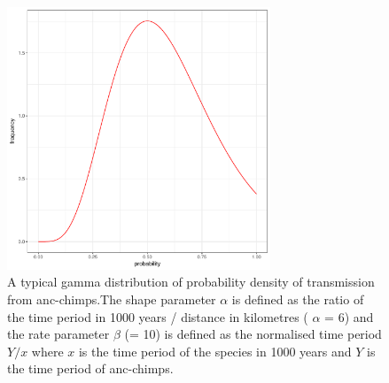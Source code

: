 \documentclass[fleqn,10pt]{wlscirep}
\begin{document}
\begin{figure}[!h]
	\centering
	\includegraphics[width=0.7\textwidth]{figs/gamma-chimp}
	\caption{ A typical gamma distribution of probability density of transmission from anc-chimps.The shape parameter $\alpha$ is defined as the ratio of the time period in 1000 years / distance in kilometres ( $\alpha$ = 6) and the rate parameter $\beta$ (= 10) is defined as the normalised time period $Y / x$ where $x$ is the time period of the species in 1000 years and $Y$ is the time period of anc-chimps.}
	\label{fig:chimp}   
\end{figure}  
\end{document}
